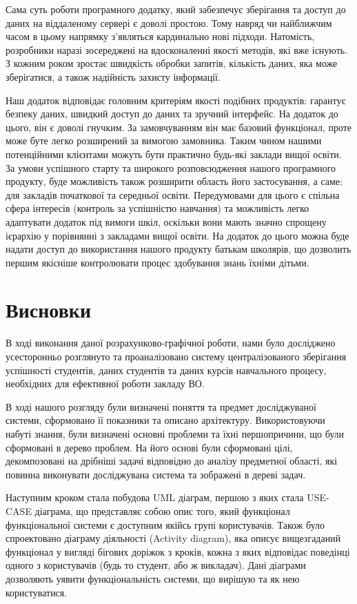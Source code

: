 \documentclass[14pt,a4paper,oneside]{extbook}
\begin{document}
	Сама суть роботи програмного додатку, який забезпечує зберігання та доступ до даних на віддаленому сервері є доволі простою. Тому навряд чи найближчим часом в цьому напрямку з’являться кардинально нові підходи. Натомість, розробники наразі зосереджені на вдосконаленні якості методів, які вже існують. З кожним роком зростає швидкість обробки запитів, кількість даних, яка може зберігатися, а також надійність захисту інформації. 

	Наш додаток відповідає головним критеріям якості подібних продуктів: гарантує безпеку даних, швидкий доступ до даних та зручний інтерфейс. На додаток до цього, він є доволі гнучким. За замовчуванням він має базовий функціонал, проте може буте легко розширений за вимогою замовника. Таким чином нашими потенційними клієнтами можуть бути практично будь-які заклади вищої освіти. За умови успішного старту та широкого розповсюдження нашого програмного продукту,   буде можливість також розширити область його застосування, а саме: для закладів початкової та середньої освіти. Передумовами для цього є спільна сфера інтересів (контроль за успішністю навчання) та можливість легко адаптувати додаток під вимоги шкіл, оскільки вони мають значно спрощену ієрархію у порівнянні з закладами вищої освіти. На додаток до цього можна буде надати доступ до використання нашого продукту батькам школярів, що дозволить першим якісніше контролювати процес здобування знань їхніми дітьми.

\chapter{Висновки}
	В ході виконання даної розрахунково-графічної роботи, нами було досліджено усесторонньо розглянуто та проаналізовано систему централізованого зберігання успішності студентів, даних студентів та даних курсів навчального процесу, необхідних для ефективної роботи закладу ВО.

	В ході нашого розгляду були визначені поняття та предмет досліджуваної системи, сформовано її показники та описано архітектуру. Використовуючи набуті знання, були визначені основні проблеми та їхні першопричини, що були сформовані в дерево проблем. На його основі були сформовані цілі, декомпозовані на дрібніші задачі відповідно до аналізу предметної області, які повинна виконувати досліджувана система та зображені в дереві задач.

	Наступним кроком стала побудова UML діаграм, першою з яких стала USE-CASE діаграма, що представляє собою опис того, який функціонал функціональної системи є доступним якійсь групі користувачів. Також було спроектовано діаграму діяльності (Activity diagram), яка описує вищезгаданий функціонал у вигляді бігових доріжок з кроків, кожна з яких відповідає поведінці одного з користувачів (будь то студент, або ж викладач). Дані діаграми дозволяють уявити функціональність системи, що вирішую та як нею користуватися.
\end{document}
